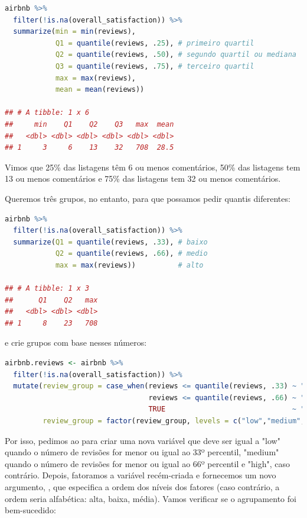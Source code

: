 \documentclass{article}
\begin{document}
\begin{lstlisting}[language=R]
airbnb %>% 
  filter(!is.na(overall_satisfaction)) %>% 
  summarize(min = min(reviews),
            Q1 = quantile(reviews, .25), # primeiro quartil
            Q2 = quantile(reviews, .50), # segundo quartil ou mediana
            Q3 = quantile(reviews, .75), # terceiro quartil
            max = max(reviews),
            mean = mean(reviews))
            
## # A tibble: 1 x 6
##     min    Q1    Q2    Q3   max  mean
##   <dbl> <dbl> <dbl> <dbl> <dbl> <dbl>
## 1     3     6    13    32   708  28.5
\end{lstlisting}


Vimos que 25\% das listagens têm 6 ou menos comentários, 50\% das listagens tem 13 ou menos comentários e 75\% das listagens tem 32 ou menos comentários.

Queremos três grupos, no entanto, para que possamos pedir quantis diferentes:

\begin{lstlisting}[language=R]
airbnb %>% 
  filter(!is.na(overall_satisfaction)) %>% 
  summarize(Q1 = quantile(reviews, .33), # baixo
            Q2 = quantile(reviews, .66), # medio
            max = max(reviews))          # alto
            
## # A tibble: 1 x 3
##      Q1    Q2   max
##   <dbl> <dbl> <dbl>
## 1     8    23   708
\end{lstlisting}

e crie grupos com base nesses números:

\begin{lstlisting}[language=R]
airbnb.reviews <- airbnb %>% 
  filter(!is.na(overall_satisfaction)) %>% 
  mutate(review_group = case_when(reviews <= quantile(reviews, .33) ~ "low",
                                  reviews <= quantile(reviews, .66) ~ "medium",
                                  TRUE                              ~ "high"),
         review_group = factor(review_group, levels = c("low","medium","high")))
\end{lstlisting}

Por isso, pedimos ao \faRProject para criar uma nova variável  que deve ser igual a "low" quando o número de revisões for menor ou igual ao 33º percentil, "medium" quando o número de revisões for menor ou igual ao 66º percentil e "high", caso contrário. Depois, fatoramos a variável  recém-criada e fornecemos um novo argumento, , que especifica a ordem dos níveis dos fatores (caso contrário, a ordem seria alfabética: alta, baixa, média). Vamos verificar se o agrupamento foi bem-sucedido:
\end{document}
